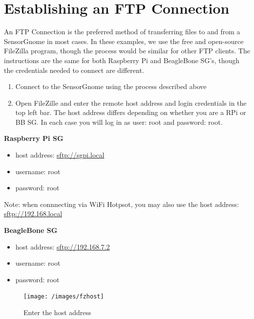 \documentclass[
]{book}
\providecommand{\tightlist}{%
  \setlength{\itemsep}{0pt}\setlength{\parskip}{0pt}}
\begin{document}
\hypertarget{establishing-an-ftp-connection}{%
\chapter{Establishing an FTP Connection}\label{establishing-an-ftp-connection}}

An FTP Connection is the preferred method of transferring files to and from a SensorGnome in most cases. In these examples, we use the free and open-source FileZilla program, though the process would be similar for other FTP clients. The instructions are the same for both Raspberry Pi and BeagleBone SG's, though the credentials needed to connect are different.

\begin{enumerate}
\def\labelenumi{\arabic{enumi})}
\item
  Connect to the SensorGnome using the process described above
\item
  Open FileZille and enter the remote host address and login credentials in the top left bar. The host address differs depending on whether you are a RPi or BB SG. In each case you will log in as user: root and password: root.
\end{enumerate}

\textbf{Raspberry Pi SG}

\begin{itemize}
\tightlist
\item
  host address: \url{sftp://sgpi.local}
\item
  username: root
\item
  password: root
\end{itemize}

Note: when connnecting via WiFi Hotpsot, you may also use the host address: \url{sftp://192.168.local}

\textbf{BeagleBone SG}

\begin{itemize}
\tightlist
\item
  host address: \url{sftp://192.168.7.2}
\item
  username: root
\item
  password: root
\end{itemize}

\begin{figure}

{\centering \texttt{[image: /images/fzhost]} 

}

\caption{Enter the host address}\label{fig:unnamed-chunk-4}
\end{figure}
\end{document}
